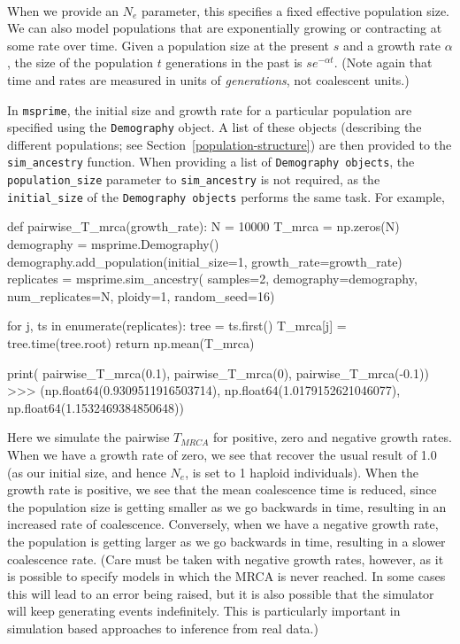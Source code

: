 \documentclass[graybox]{svmult}
\newcommand{\msprime}[0]{\texttt{msprime}}
\begin{document}
\label{exponentially-growingshrinking-populations} \

When we provide an \(N_e\) parameter, this specifies a fixed effective
population size. We can also model populations that are exponentially
growing or contracting at some rate over time. Given a population size
at the present \(s\) and a growth rate \(\alpha\), the size of the
population \(t\) generations in the past is $s e^{-\alpha t}$. (Note
again that time and rates are measured in units of \emph{generations},
not coalescent units.)

In \msprime, the initial size and growth rate for a particular population
are specified using the \texttt{Demography} object. A list
of these objects (describing the different populations; see
Section~\ref{population-structure}) are then provided to the
\texttt{sim\_ancestry}
function. When providing a list of
\texttt{Demography\ objects}, the \texttt{population\_size} parameter to
\texttt{sim\_ancestry} is not required, as the \texttt{initial\_size} of the
\texttt{Demography\ objects} performs the same task. For example,

\begin{pythoncode}
def pairwise_T_mrca(growth_rate):
    N = 10000
    T_mrca = np.zeros(N)
    demography = msprime.Demography()
    demography.add_population(initial_size=1,
                              growth_rate=growth_rate)
    replicates = msprime.sim_ancestry(
        samples=2,
        demography=demography,
        num_replicates=N,
        ploidy=1,
        random_seed=16)

    for j, ts in enumerate(replicates):
        tree = ts.first()
        T_mrca[j] = tree.time(tree.root)
    return np.mean(T_mrca)

print(
    pairwise_T_mrca(0.1), pairwise_T_mrca(0),
    pairwise_T_mrca(-0.1))
>>> (np.float64(0.9309511916503714),
     np.float64(1.0179152621046077),
     np.float64(1.1532469384850648))
\end{pythoncode}

    Here we simulate the pairwise \(T_{MRCA}\) for positive, zero and
negative growth rates. When we have a growth rate of zero, we see that
recover the usual result of 1.0 (as our initial size, and hence \(N_e\),
is set to 1 haploid individuals). When the growth rate is positive, we see that the
mean coalescence time is reduced, since the population size is getting
smaller as we go backwards in time, resulting in an increased rate of
coalescence. Conversely, when we have a negative growth rate, the
population is getting larger as we go backwards in time, resulting in a
slower coalescence rate. (Care must be taken with negative growth rates,
however, as it is possible to specify models in which the MRCA is never
reached. In some cases this will lead to an error being raised, but it
is also possible that the simulator will keep generating events
indefinitely. This is particularly important in simulation based
approaches to inference from real data.)
\end{document}
